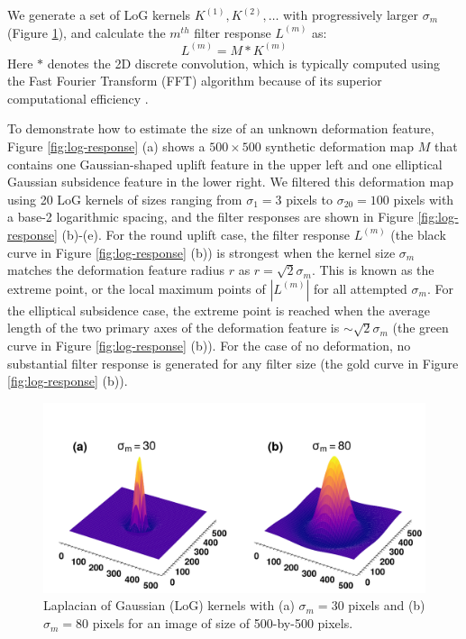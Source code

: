 \documentclass{utexasthesis}
\begin{document}
We generate a set of LoG kernels $K^{(1)}, K^{(2)}, \ldots$ with progressively larger $\sigma_m$ (Figure \ref{fig:log-kernel}), and calculate the $m^{th}$ filter response $ L^{(m)} $ as:
\begin{equation}
L^{(m)} = M \ast K^{(m)}  \label{eq:log-layer-conv}
\end{equation}
Here $*$ denotes the 2D discrete convolution, which is typically computed using the Fast Fourier Transform (FFT) algorithm because of its superior computational efficiency \cite{Szeliski2022ComputerVision}.

To demonstrate how to estimate the size of an unknown deformation feature, Figure \ref{fig:log-response} (a) shows a $500 \times 500$ synthetic deformation map $M$ that contains one Gaussian-shaped uplift feature in the upper left and one elliptical Gaussian subsidence feature in the lower right. We filtered this deformation map using 20 LoG kernels of sizes ranging from $\sigma_1 = 3$ pixels to $\sigma_{20} = 100$ pixels with a base-2 logarithmic spacing, and the filter responses are shown in Figure \ref{fig:log-response} (b)-(e). For the round uplift case, the filter response $L^{(m)}$ (the black curve in Figure \ref{fig:log-response} (b)) is strongest when the kernel size $\sigma_m$ matches the deformation feature radius $r$ as $r = \sqrt{2}\sigma_m$. This is known as the extreme point, or the local maximum points of $|L^{(m)}|$ for all attempted $\sigma_m$. For the elliptical subsidence case, the extreme point is reached when the average length of the two primary axes of the deformation feature is $\sim \sqrt{2}\sigma_m$ (the green curve in Figure \ref{fig:log-response} (b)). For the case of no deformation, no substantial filter response is generated for any filter size (the gold curve in Figure \ref{fig:log-response} (b)).

\begin{figure}[hbt!]
\centering
 \includegraphics[width=0.98\linewidth]{paper2/figures/figure1_log_examples.pdf}
\caption{
Laplacian of Gaussian (LoG) kernels with (a) $\sigma_m=30$ pixels and (b) $\sigma_m=80$ pixels for an image of size of 500-by-500 pixels.
}
\label{fig:log-kernel}
%
\end{figure}
\end{document}
